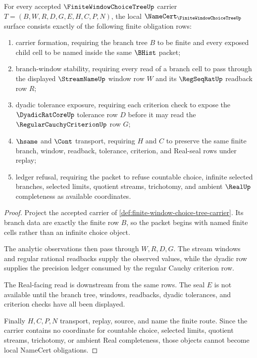 \begin{theorem}
\label{thm:finite-window-choice-tree-namecert-obligations}
For every accepted $\FiniteWindowChoiceTreeUp$ carrier $T=(B,W,R,D,G,E,H,C,P,N)$, the local $\NameCert_{\FiniteWindowChoiceTreeUp}$ surface consists exactly of the following finite obligation rows:
\begin{enumerate}
\item carrier formation, requiring the branch tree $B$ to be finite and every exposed child cell to be named inside the same $\BHist$ packet;
\item branch-window stability, requiring every read of a branch cell to pass through the displayed $\StreamNameUp$ window row $W$ and its $\RegSeqRatUp$ readback row $R$;
\item dyadic tolerance exposure, requiring each criterion check to expose the $\DyadicRatCoreUp$ tolerance row $D$ before it may read the $\RegularCauchyCriterionUp$ row $G$;
\item $\hsame$ and $\Cont$ transport, requiring $H$ and $C$ to preserve the same finite branch, window, readback, tolerance, criterion, and Real-seal rows under replay;
\item ledger refusal, requiring the packet to refuse countable choice, infinite selected branches, selected limits, quotient streams, trichotomy, and ambient $\RealUp$ completeness as available coordinates.
\end{enumerate}
\end{theorem}
\begin{proof}
Project the accepted carrier of \autoref{def:finite-window-choice-tree-carrier}. Its branch data are exactly the finite row $B$, so the packet begins with named finite cells rather than an infinite choice object.

The analytic observations then pass through $W,R,D,G$. The stream windows and regular rational readbacks supply the observed values, while the dyadic row supplies the precision ledger consumed by the regular Cauchy criterion row.

The Real-facing read is downstream from the same rows. The seal $E$ is not available until the branch tree, windows, readbacks, dyadic tolerances, and criterion checks have all been displayed.

Finally $H,C,P,N$ transport, replay, source, and name the finite route. Since the carrier contains no coordinate for countable choice, selected limits, quotient streams, trichotomy, or ambient Real completeness, those objects cannot become local NameCert obligations.
\end{proof}

